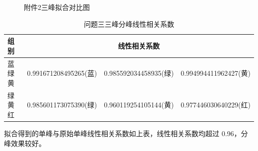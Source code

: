\documentclass{article}
\numberwithin{equation}{subsection}
\begin{document}
\begin{figure}[htbp]
    \centering
    
    \caption{附件2三峰拟合对比图}
\end{figure}

\begin{table}[h]
    \centering
    \begin{tabular}{|l|c|c|c|}\hline
        组别&\multicolumn{3}{c|}{线性相关系数}\\\hline
        蓝绿黄&0.991671208495265(蓝)&0.985592034458935(绿)&0.994994411962427(黄)\\
        绿黄红&0.985601173075390(绿)&0.960119254105144(黄)&0.977446030640229(红)\\
        \hline
    \end{tabular}
    \caption{问题三三峰分峰线性相关系数}
    \label{双峰分峰线性相关系数}
\end{table}
拟合得到的单峰与原始单峰线性相关系数如上表，线性相关系数均超过 0.96，分峰效果较好。
\end{document}
